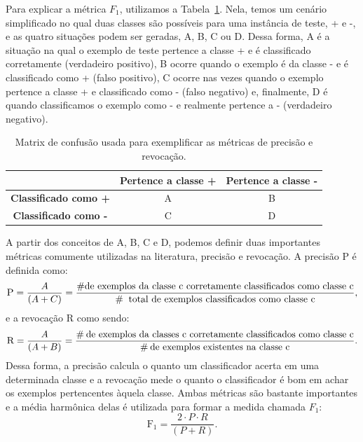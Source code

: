 Para explicar a métrica $F_1$, utilizamos a Tabela~\ref{table::confusao}. Nela, temos um cenário simplificado no qual duas classes são possíveis para uma instância de teste, + e -, e as quatro situações podem ser geradas, A, B, C ou D. Dessa forma, A é a situação na qual o exemplo de teste pertence a classe + e é classificado corretamente (verdadeiro positivo), B ocorre quando o exemplo é da classe - e é classificado como + (falso positivo), C ocorre nas vezes quando o exemplo pertence a classe + e classificado como - (falso negativo) e, finalmente, D é quando classificamos o exemplo como - e realmente pertence a - (verdadeiro negativo).

\begin{table}[ht*]
\centering
\begin{tabular}{|c|c|c|}
\toprule
       &    \textbf{Pertence a classe +} & \textbf{Pertence a classe -} \\
\midrule
    \textbf{Classificado como +}  & A & B \tabularnewline \hline
    \textbf{Classificado como -}  & C & D \tabularnewline
\bottomrule
\end{tabular}
\caption{Matrix de confusão usada para exemplificar as métricas de precisão e revocação.}
\label{table::confusao}
\end{table}

A partir dos conceitos de A, B, C e D, podemos definir duas importantes métricas comumente utilizadas na literatura, precisão e revocação. A precisão \textsc{P} é definida como:
\begin{equation}
\textsc{P} = \frac{A}{(A+C)} = \frac{\# \text{de exemplos da classe c corretamente classificados como classe c}} {\# \: \text{ total de exemplos classificados como classe c}} \\,
\end{equation}
e a revocação \textsc{R} como sendo:
\begin{equation}
\textsc{R} = \frac{A}{(A+B)} = \frac{\# \: \text{de exemplos da classes c corretamente classificados como classe c}}{\# \: \text{de exemplos existentes na classe c}}.
\end{equation}
Dessa forma, a precisão calcula o quanto um classificador acerta em uma determinada classe e a revocação mede o quanto o classificador é bom em achar os exemplos pertencentes àquela classe.
Ambas métricas são bastante importantes e a média harmônica delas é utilizada para formar a medida chamada $F_1$:
\begin{equation}
\text{F}_1 = \frac{2 \cdot P \cdot R}{(P + R)}.
\end{equation}

